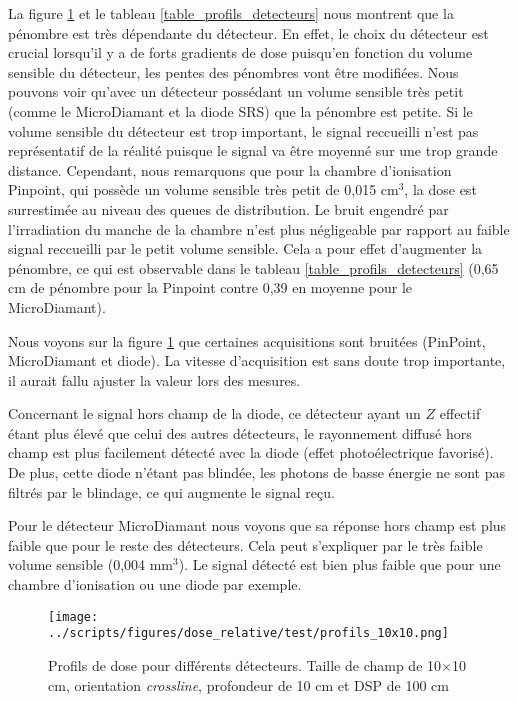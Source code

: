 \documentclass{book}
\begin{document}
La figure \ref*{fig_profils_detecteurs} et le tableau \ref{table_profils_detecteurs} nous montrent que la pénombre est très dépendante du détecteur. En effet, le choix du détecteur est crucial lorsqu'il y a de forts gradients de dose puisqu'en fonction du volume sensible du détecteur, les pentes des pénombres vont être modifiées. Nous pouvons voir qu'avec un détecteur possédant un volume sensible très petit (comme le MicroDiamant et la diode SRS) que la pénombre est petite. Si le volume sensible du détecteur est trop important, le signal reccueilli n'est pas représentatif de la réalité puisque le signal va être moyenné sur une trop grande distance. Cependant, nous remarquons que pour la chambre d'ionisation Pinpoint, qui possède un volume sensible très petit de 0,015 cm$^3$, la dose est surrestimée au niveau des queues de distribution. Le bruit engendré par l'irradiation du manche de la chambre n'est plus négligeable par rapport au faible signal reccueilli par le petit volume sensible. Cela a pour effet d'augmenter la pénombre, ce qui est observable dans le tableau \ref{table_profils_detecteurs} (0,65 cm de pénombre pour la Pinpoint contre 0,39 en moyenne pour le MicroDiamant).

Nous voyons sur la figure \ref*{fig_profils_detecteurs} que certaines acquisitions sont bruitées (PinPoint, MicroDiamant et diode). La vitesse d'acquisition est sans doute trop importante, il aurait fallu ajuster la valeur lors des mesures.

Concernant le signal hors champ de la diode, ce détecteur ayant un $Z$ effectif étant plus élevé que celui des autres détecteurs, le rayonnement diffusé hors champ est plus facilement détecté avec la diode (effet photoélectrique favorisé). De plus, cette diode n'étant pas blindée, les photons de basse énergie ne sont pas filtrés par le blindage, ce qui augmente le signal reçu.

Pour le détecteur MicroDiamant nous voyons que sa réponse hors champ est plus faible que pour le reste des détecteurs. Cela peut s'expliquer par le très faible volume sensible (0,004 mm$^3$). Le signal détecté est bien plus faible que pour une chambre d'ionisation ou une diode par exemple.

\begin{figure}[h]
  \centering
  \texttt{[image: ../scripts/figures/dose\_relative/test/profils\_10x10.png]}
  \caption{Profils de dose pour différents détecteurs. Taille de champ de 10$\times$10 cm, orientation \textit{crossline}, profondeur de 10 cm et DSP de 100 cm}
  \label{fig_profils_detecteurs}
\end{figure}
\end{document}
